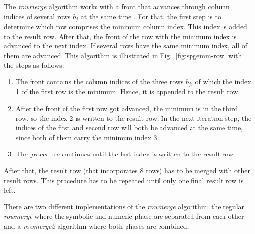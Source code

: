 The \textit{rowmerge} algorithm works with a front that advances through column indices of several rows $b_j$ at the same time \cite{gremse2015gpu}. For that, the first step is to determine which row comprises the minimum column index. This index is added to the result row. After that, the front of the row with the minimum index is advanced to the next index. If several rows have the same minimum index, all of them are advanced. This algorithm is illustrated in Fig.~\ref{fig:spgemm-row} with the steps as follows:
\begin{enumerate}[label=\alph*)]
\item The front contains the column indices of the three rows $b_j$, of which the index 1 of the first row is the minimum. Hence, it is appended to the result row.
\item After the front of the first row got advanced, the minimum is in the third row, so the index 2 is written to the result row. In the next iteration step, the indices of the first and second row will both be advanced at the same time, since both of them carry the minimum index 3.
\item The procedure continues until the last index is written to the result row.
\end{enumerate}
After that, the result row (that incorporates 8 rows) has to be merged with other result rows. This procedure has to be repeated until only one final result row is left.

There are two different implementations of the \textit{rowmerge} algorithm: the regular \textit{rowmerge} where the symbolic and numeric phase are separated from each other and a \textit{rowmerge2} algorithm where both phases are combined. 

